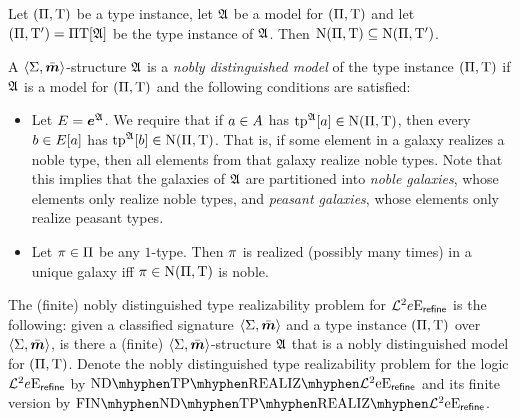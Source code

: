 \begin{remark}
Let $(\Pi,\mathrm{T})$ be a type instance, let $\mathfrak{A}$ be a model for
$(\Pi,\mathrm{T})$ and let $(\Pi,{\mathrm{T}'}) = \Pi\mathrm{T}[\mathfrak{A}]$ be the type
instance of $\mathfrak{A}$. Then $\mathrm{\mathrm{N}}(\Pi,\mathrm{T}) \subseteq \mathrm{\mathrm{N}}(\Pi,{\mathrm{T}'})$.
\end{remark}

\begin{definition}
A $\left\langle \mathrm{\Sigma},\bar{\bm{m}} \right\rangle$-structure $\mathfrak{A}$ is a \emph{nobly distinguished model} of
the type instance $(\Pi,\mathrm{T})$ if $\mathfrak{A}$ is a model for $(\Pi,\mathrm{T})$
and the following conditions are satisfied:
\begin{itemize}
  \item[\condrealizd]\label{cond:realizd}
  Let $E = \bm{e}^{\mathfrak{A}}$. We require that if $a \in
  A$ has $\operatorname{tp}^{\mathfrak{A}}[a] \in \mathrm{\mathrm{N}}(\Pi,\mathrm{T})$, then every $b \in E[a]$
  has $\operatorname{tp}^{\mathfrak{A}}[b] \in \mathrm{\mathrm{N}}(\Pi,\mathrm{T})$. That is, if some element in a galaxy
  realizes a noble type, then all elements from that galaxy realize noble types.
  Note that this implies that the galaxies of $\mathfrak{A}$ are partitioned into
  \emph{noble galaxies}, whose elements only realize noble types, and
  \emph{peasant galaxies}, whose elements only realize peasant types.
  \item[\condrealizn]\label{cond:realizn}
  Let $\pi \in \Pi$ be any $1$-type. Then $\pi$ is realized
  (possibly many times) in a unique galaxy iff $\pi \in \mathrm{\mathrm{N}}(\Pi,\mathrm{T})$ is
  noble.
\end{itemize}
\end{definition}

\begin{definition}
The (finite) nobly distinguished type realizability problem for
$\mathcal{L}^{2}{e}\mathrm{E}_{\mathsf{refine}}$ is the following: given a classified signature
$\left\langle \mathrm{\Sigma},\bar{\bm{m}} \right\rangle$ and a type instance $(\Pi,\mathrm{T})$ over $\left\langle \mathrm{\Sigma},\bar{\bm{m}} \right\rangle$,
is there a (finite) $\left\langle \mathrm{\Sigma},\bar{\bm{m}} \right\rangle$-structure $\mathfrak{A}$ that is a nobly
distinguished model for $(\Pi,\mathrm{T})$. Denote the nobly distinguished type
realizability problem for the logic $\mathcal{L}^{2}{e}\mathrm{E}_{\mathsf{refine}}$ by
$\NDReal{\vFo2\Eea\sze\agrefine}$ and its finite version by
$\FinNDReal{\vFo2\Eea\sze\agrefine}$.
\end{definition}

